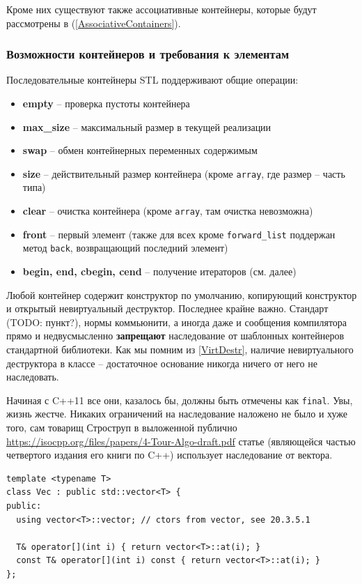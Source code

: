 \documentclass[a4paper,12pt,oneside]{article}
\begin{document}
Кроме них существуют также ассоциативные контейнеры, которые будут рассмотрены в (\ref{AssociativeContainers}).

\subsubsection{Возможности контейнеров и требования к элементам}\label{StandardOperations}

Последовательные контейнеры STL поддерживают общие операции: 

\begin{itemize}
\item \textbf{empty} -- проверка пустоты контейнера
\item \textbf{max\_size} -- максимальный размер в текущей реализации
\item \textbf{swap} -- обмен контейнерных переменных содержимым
\item \textbf{size} -- действительный размер контейнера (кроме \lstinline!array!, где размер -- часть типа)
\item \textbf{clear} -- очистка контейнера (кроме \lstinline!array!, там очистка невозможна)
\item \textbf{front} -- первый элемент (также для всех кроме \lstinline!forward_list! поддержан метод \lstinline!back!, возвращающий последний элемент)
\item \textbf{begin, end, cbegin, cend} -- получение итераторов (см. далее)
\end{itemize}

Любой контейнер содержит конструктор по умолчанию, копирующий конструктор и открытый невиртуальный деструктор. Последнее крайне важно. Стандарт (TODO: пункт?), нормы коммьюнити, а иногда даже и сообщения компилятора прямо и недвусмысленно \textbf{запрещают} наследование от шаблонных контейнеров стандартной библиотеки. Как мы помним из \ref{VirtDestr}, наличие невиртуального деструктора в классе -- достаточное основание никогда ничего от него не наследовать.

Начиная с C++11 все они, казалось бы, должны быть отмечены как \lstinline!final!. Увы, жизнь жестче. Никаких ограничений на наследование наложено не было и хуже того, сам товарищ Строструп в выложенной публично \url{https://isocpp.org/files/papers/4-Tour-Algo-draft.pdf} статье (являющейся частью четвертого издания его книги по C++) использует наследование от вектора.

\begin{lstlisting}
template <typename T>
class Vec : public std::vector<T> {
public:
  using vector<T>::vector; // ctors from vector, see 20.3.5.1

  T& operator[](int i) { return vector<T>::at(i); }
  const T& operator[](int i) const { return vector<T>::at(i); }
};
\end{lstlisting}
\end{document}

